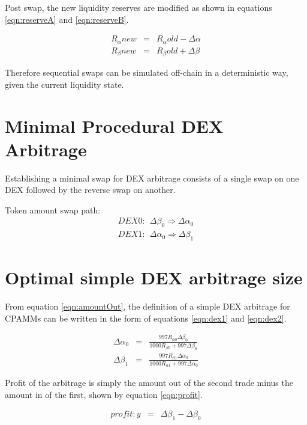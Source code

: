 \documentclass[runningheads]{llncs}
\begin{document}
	Post swap, the new liquidity reserves are modified as shown in equations \ref{eqn:reserveA} and \ref{eqn:reserveB}.
	
	\begin{eqnarray}
		R_{\alpha}{new}  &=& R_{\alpha}{old} - \Delta\alpha  \label{eqn:reserveA}\\
		R_{\beta}{new}  &=& R_{\beta}{old} + \Delta\beta  \label{eqn:reserveB}
	\end{eqnarray}
	
	Therefore sequential swaps can be simulated off-chain in a deterministic way, given the current liquidity state.
	
	\section{Minimal Procedural DEX Arbitrage}
	Establishing a minimal swap for DEX arbitrage consists of a single swap on one DEX followed by the reverse swap on another.
	
	Token amount swap path:
	\begin{eqnarray}
		DEX0: \: \: \Delta\beta_{0} \Rightarrow \Delta\alpha_{0}\\
		DEX1: \: \: \Delta\alpha_{0} \Rightarrow \Delta\beta_{1}
	\end{eqnarray}
	
	\section{Optimal simple DEX arbitrage size}
	From equation \ref{eqn:amountOut}, the definition of a simple DEX arbitrage for CPAMMs can be written in the form of equations \ref{eqn:dex1} and \ref{eqn:dex2}.
	
	\begin{eqnarray}
		 \Delta\alpha_{0}  &=& \frac{997 R_{\alpha 0} \Delta\beta_{0} }{1000 R_{\beta 0} + 997 \Delta\beta_{0}} \label{eqn:dex1}\\
		 \Delta\beta_{1}  &=& \frac{997 R_{\beta 1} \Delta\alpha_{0} }{1000 R_{\alpha 1} + 997 \Delta\alpha_{0}} \label{eqn:dex2}
	\end{eqnarray}
	
	Profit of the arbitrage is simply the amount out of the second trade minus the amount in of the first, shown by equation \ref{eqn:profit}.
	
	\begin{eqnarray}
		profit: y  &=& \Delta\beta_{1} - \Delta\beta_{0} \label{eqn:profit}
	\end{eqnarray}
	
\end{document}
